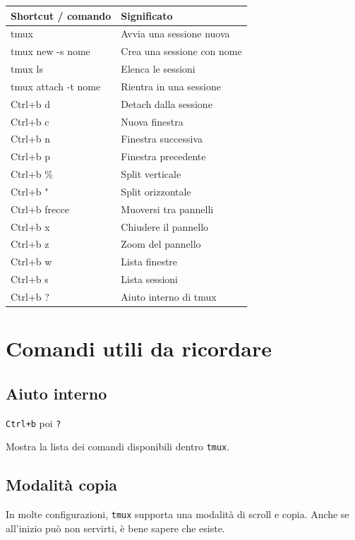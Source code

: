 \documentclass[a4paper,11pt]{article}
\begin{document}
\begin{center}
\renewcommand{\arraystretch}{1.25}
\begin{tabularx}{\textwidth}{>{\ttfamily}l X}
\toprule
Shortcut / comando & Significato \\
\midrule
tmux & Avvia una sessione nuova \\
tmux new -s nome & Crea una sessione con nome \\
tmux ls & Elenca le sessioni \\
tmux attach -t nome & Rientra in una sessione \\
Ctrl+b d & Detach dalla sessione \\
Ctrl+b c & Nuova finestra \\
Ctrl+b n & Finestra successiva \\
Ctrl+b p & Finestra precedente \\
Ctrl+b \% & Split verticale \\
Ctrl+b " & Split orizzontale \\
Ctrl+b frecce & Muoversi tra pannelli \\
Ctrl+b x & Chiudere il pannello \\
Ctrl+b z & Zoom del pannello \\
Ctrl+b w & Lista finestre \\
Ctrl+b s & Lista sessioni \\
Ctrl+b ? & Aiuto interno di tmux \\
\bottomrule
\end{tabularx}
\end{center}

\section{Comandi utili da ricordare}
\subsection{Aiuto interno}
\begin{codebox}
\texttt{Ctrl+b} poi \texttt{?}
\end{codebox}

Mostra la lista dei comandi disponibili dentro \texttt{tmux}.

\subsection{Modalità copia}
In molte configurazioni, \texttt{tmux} supporta una modalità di scroll e copia. Anche se all'inizio può non servirti, è bene sapere che esiste.
\end{document}

